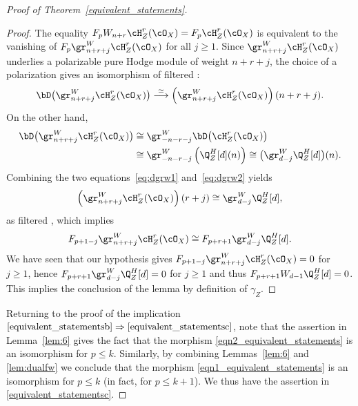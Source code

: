 \begin{proof}[Proof of Theorem~\ref{equivalent_statements}]
\begin{proof}
The equality $F_pW_{n+r}\cH^r_Z(\cO_X)=F_p\cH^r_Z(\cO_X)$ is equivalent to the vanishing of
$F_p \gr^W_{n+r+j}\cH^r_Z(\cO_X)$ for all $j\geq 1$. Since $\gr^W_{n+r+j}\cH^r_Z(\cO_X)$ underlies a polarizable pure Hodge module of weight $n+r+j$, the choice of a polarization gives an isomorphism of filtered \DXmodules:
\begin{equation}\label{eq:dgrw1}
\bD\big(\gr^W_{n+r+j}\cH^r_Z(\cO_X)\big) \overset{\simeq}\longrightarrow \left(\gr^W_{n+r+j}\cH^r_Z(\cO_X)\right) (n+r+j).
\end{equation}
On the other hand,
\begin{equation}\label{eq:dgrw2}
\begin{aligned}
\bD\big(\gr^W_{n+r+j}\cH^r_Z(\cO_X)\big) &\cong \gr^W_{-n-r-j} \bD\big(\cH^r_Z(\cO_X)\big) \\
& \cong \gr^W_{-n-r-j} \left(\Q_Z^H[d](n)\right) \cong \big(\gr^W_{d-j} \Q_Z^H[d]\big)(n).
\end{aligned}
\end{equation}
Combining the two equations~\eqref{eq:dgrw1} and~\eqref{eq:dgrw2} yields\vspace*{-3pt}
\[
\left(\gr^W_{n+r+j}\cH^r_Z(\cO_X)\right) (r+j) \cong \gr^W_{d-j}\Q_Z^H[d],
\]
as filtered \DXmodules, which implies\vspace*{-3pt}\enlargethispage{\baselineskip}
\[
F_{p+1-j} \gr^W_{n+r+j}\cH^r_Z(\cO_X) \cong F_{p+r+1} \gr^W_{d-j}\Q^H_Z[d].
\]
We have seen that our hypothesis gives $F_{p+1-j} \gr^W_{n+r+j}\cH^r_Z(\cO_X)=0$ for $j\geq 1$, hence
$F_{p+r+1} \gr^W_{d-j}\Q_Z^H[d]=0$ for $j\geq 1$ and thus
$F_{p+r+1} W_{d-1}\Q_Z^H[d]=0$. This implies the conclusion of the lemma by definition of $\gamma_Z$.
\end{proof}

Returning to the proof of the implication $\eqref{equivalent_statementsb}\Rightarrow\eqref{equivalent_statementsc}$,
note that the assertion in Lemma~\ref{lem:6}
gives the fact that the morphism \eqref{eqn2_equivalent_statements} is an isomorphism for $p\leq k$.
Similarly, by combining Lemmas~\ref{lem:6} and \ref{lem:dualfw} we conclude that the morphism
\eqref{eqn1_equivalent_statements} is an isomorphism for $p\leq k$ (in fact, for $p\leq k+1$). We thus have the assertion in \eqref{equivalent_statementsc}.


\end{proof}
